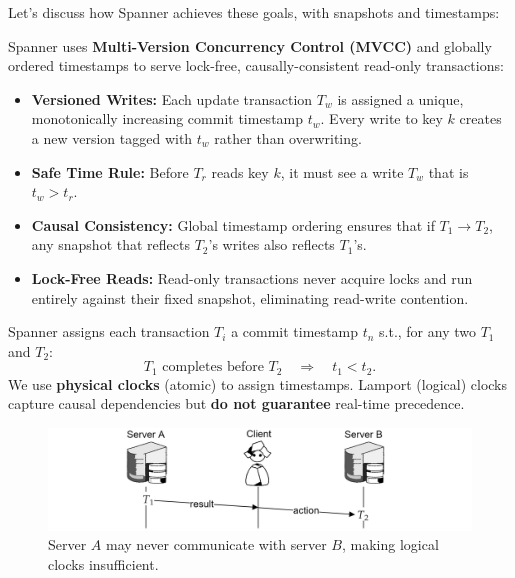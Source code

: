    \newpage 

    \noindent
    Let's discuss how Spanner achieves these goals, with snapshots and timestamps:
    \begin{Def}

        \label{def:spanner}
        Spanner uses \textbf{Multi-Version Concurrency Control (MVCC)} and globally ordered timestamps to serve lock-free, causally-consistent read-only transactions:
        
        \begin{itemize}
          \item \textbf{Versioned Writes:} Each update transaction $T_w$ is assigned a unique, monotonically increasing commit timestamp $t_w$.  Every write to key $k$ creates a new version tagged with $t_w$ rather than overwriting.
          \item \textbf{Safe Time Rule:} Before $T_r$ reads key $k$, it must see a write $T_w$ that is $t_w > t_r$.
          \item \textbf{Causal Consistency:} Global timestamp ordering ensures that if $T_1\to T_2$, any snapshot that reflects $T_2$'s writes also reflects $T_1$'s.
          \item \textbf{Lock-Free Reads:} Read-only transactions never acquire locks and run entirely against their fixed snapshot, eliminating read-write contention.
        \end{itemize}
        \end{Def}
        
        \noindent
    \noindent
    
    \begin{Def}
        
        Spanner assigns each transaction \(T_i\) a commit timestamp \(t_n\) s.t., for any two \(T_1\) and \(T_2\):
        \[
        T_1 \text{ completes before } T_2 \quad\Longrightarrow\quad t_1 < t_2.
        \]
        \noindent
        We use \textbf{physical clocks} (atomic) to assign timestamps. Lamport (logical) clocks capture causal dependencies but \textbf{do not guarantee} real-time precedence.
        \end{Def}
    \begin{figure}[ht!]
        \centering
        \includegraphics[width=\textwidth]{Sections/span/tt.png}
        \caption{Server $A$ may never communicate with server $B$, making logical clocks insufficient.}
    \end{figure}
        
